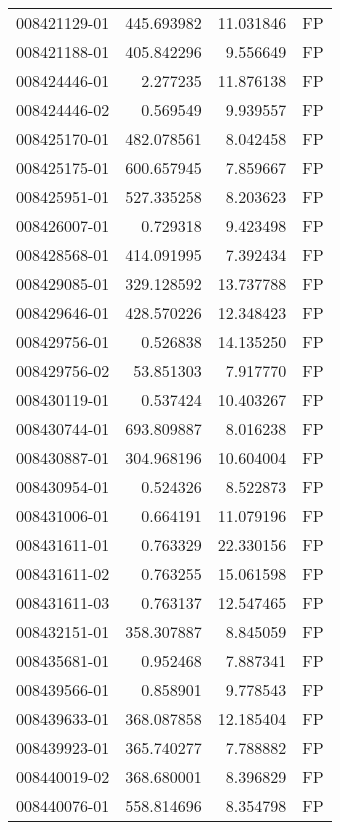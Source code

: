 \begin{tabular}{lrrl}
008421129-01 &  445.693982 &      11.031846 &   FP \\
008421188-01 &  405.842296 &       9.556649 &   FP \\
008424446-01 &    2.277235 &      11.876138 &   FP \\
008424446-02 &    0.569549 &       9.939557 &   FP \\
008425170-01 &  482.078561 &       8.042458 &   FP \\
008425175-01 &  600.657945 &       7.859667 &   FP \\
008425951-01 &  527.335258 &       8.203623 &   FP \\
008426007-01 &    0.729318 &       9.423498 &   FP \\
008428568-01 &  414.091995 &       7.392434 &   FP \\
008429085-01 &  329.128592 &      13.737788 &   FP \\
008429646-01 &  428.570226 &      12.348423 &   FP \\
008429756-01 &    0.526838 &      14.135250 &   FP \\
008429756-02 &   53.851303 &       7.917770 &   FP \\
008430119-01 &    0.537424 &      10.403267 &   FP \\
008430744-01 &  693.809887 &       8.016238 &   FP \\
008430887-01 &  304.968196 &      10.604004 &   FP \\
008430954-01 &    0.524326 &       8.522873 &   FP \\
008431006-01 &    0.664191 &      11.079196 &   FP \\
008431611-01 &    0.763329 &      22.330156 &   FP \\
008431611-02 &    0.763255 &      15.061598 &   FP \\
008431611-03 &    0.763137 &      12.547465 &   FP \\
008432151-01 &  358.307887 &       8.845059 &   FP \\
008435681-01 &    0.952468 &       7.887341 &   FP \\
008439566-01 &    0.858901 &       9.778543 &   FP \\
008439633-01 &  368.087858 &      12.185404 &   FP \\
008439923-01 &  365.740277 &       7.788882 &   FP \\
008440019-02 &  368.680001 &       8.396829 &   FP \\
008440076-01 &  558.814696 &       8.354798 &   FP \\

\end{tabular}
